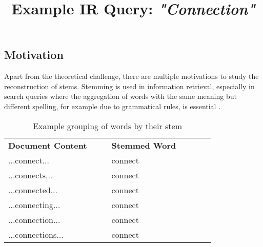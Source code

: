 \documentclass[11pt]{article}
\begin{document}
\subsection{Motivation}

Apart from the theoretical challenge, there are multiple motivations to study the reconstruction of stems. Stemming is used in information retrieval, especially in search queries where the aggregation of words with the same meaning but different spelling, for example due to grammatical rules, is essential \citep{UyarStemming}. 

\begin{table}[!ht]
    \centering
    \title{\Large Example IR Query: \textit{"Connection"}}
    \begin{tabular}{p{0.4\linewidth}p{0.4\linewidth}}
        \textbf{Document Content} & \textbf{Stemmed Word} \citep{porterstemmer} \\
        ...connect... & connect \\
        ...connects... & connect \\
        ...connected... & connect \\
        ...connecting... & connect \\
        ...connection... & connect \\
        ...connections... & connect \\
    \end{tabular}
    \caption{Example grouping of words by their stem}
\end{table}
\end{document}
